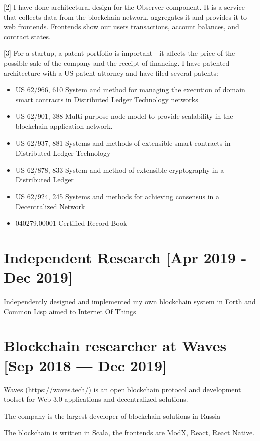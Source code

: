 \documentclass[11pt]{article}
\begin{document}
[2] I have done architectural design for the Observer
component. It is a service that collects data from the
blockchain network, aggregates it and provides it to web
frontends. Frontends show our users transactions, account
balances, and contract states.

[3] For a startup, a patent portfolio is important - it
affects the price of the possible sale of the company and
the receipt of financing. I have patented architecture with
a US patent attorney and have filed several patents:
\begin{itemize}
\item US 62/966, 610 System and method for managing the
execution of domain smart contracts in Distributed
Ledger Technology networks
\item US 62/901, 388 Multi-purpose node model to provide
scalability in the blockchain application network.
\item US 62/937, 881 Systems and methods of extensible smart
contracts in Distributed Ledger Technology
\item US 62/878, 833 System and method of extensible
cryptography in a Distributed Ledger
\item US 62/924, 245 Systems and methods for achieving
consensus in a Decentralized Network
\item 040279.00001 Certified Record Book
\end{itemize}

\section{\textbf{Independent Research} [Apr 2019 - Dec 2019]}
\label{sec:org196bf71}

Independently designed and implemented my own blockchain
system in Forth and Common Lisp aimed to Internet Of Things

\section{\textbf{Blockchain researcher} at \textbf{Waves} [Sep 2018 — Dec 2019]}
\label{sec:orgc42a297}

Waves (\url{https://waves.tech/}) is an open blockchain protocol
and development toolset for Web 3.0 applications and
decentralized solutions.

The company is the largest developer of blockchain solutions
in Russia

The blockchain is written in Scala, the frontends are ModX,
React, React Native.
\end{document}
